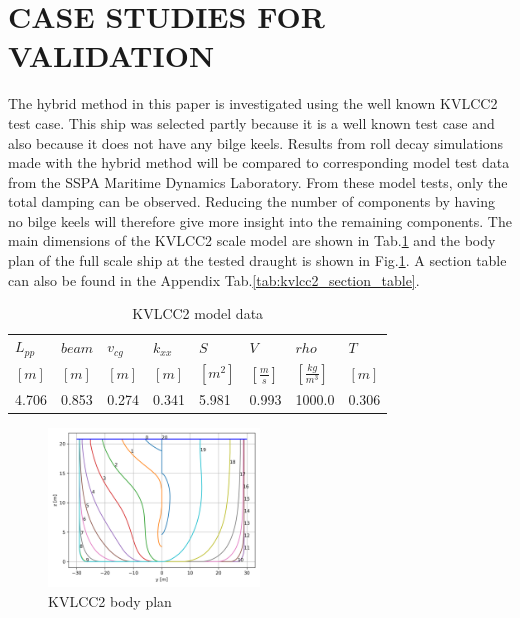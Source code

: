 \section*{CASE STUDIES FOR VALIDATION}\label{case-studies-for-validation}
The hybrid method in this paper is investigated using the well known
KVLCC2 test case. This ship was selected partly because it is a well
known test case and also because it does not have any bilge keels.
Results from roll decay simulations made with the hybrid method will be
compared to corresponding model test data from the SSPA Maritime
Dynamics Laboratory. From these model tests, only the total damping can
be observed. Reducing the number of components by having no bilge keels
will therefore give more insight into the remaining components. The main
dimensions of the KVLCC2 scale model are shown in
Tab.\ref{tab:kvlcc2_model_data} and the body plan of the full
scale ship at the tested draught is shown in
Fig.\ref{fig:body_plan}. A section table can also be found in
the Appendix Tab.\ref{tab:kvlcc2_section_table}.
\begin{table}[H]
\scriptsize
\center
\caption{KVLCC2 model data}
\label{tab:kvlcc2_model_data}
\begin{tabular}{|l|l|l|l|l|l|l|l|}
\hline\addlinespace
$L_{pp}$ & $beam$ & $v_{cg}$ & $k_{xx}$ & $S$ & $V$ & $rho$ & $T$\\
$[m]$ & $[m]$ & $[m]$ & $[m]$ & $[m^2]$ & $\left[\frac{m}{s}\right]$ & $\left[\frac{kg}{m^3}\right]$ & $[m]$\\
\hline4.706 & 0.853 & 0.274 & 0.341 & 5.981 & 0.993 & 1000.0 & 0.306\\
\hline
\end{tabular}
\end{table}
\begin{figure}[H]
\begin{center}\includegraphics[width = 0.5\textwidth]{figures/body_plan.png}\end{center}
\vspace{-1cm}
\caption{KVLCC2 body plan}
\label{fig:body_plan}
\end{figure}
